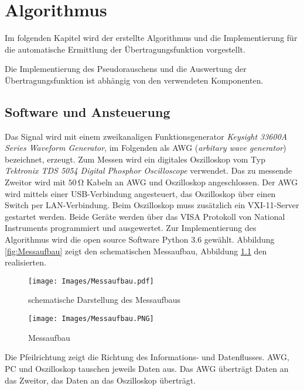 \documentclass[12pt,report,final,twoside,accentcolor=tud9b,bigchapter]{tudreport}
\begin{document}
\chapter{Algorithmus} \label{sec:algorithmus}
Im folgenden Kapitel wird der erstellte Algorithmus und die Implementierung für die automatische Ermittlung der Übertragungsfunktion vorgestellt.

Die Implementierung des Pseudorauschens und die Auswertung der Übertragungsfunktion ist abhängig von den verwendeten Komponenten.

\section{Software und Ansteuerung}
Das Signal wird mit einem zweikanaligen Funktionsgenerator \textit{Keysight 33600A Series Waveform Generator}, im Folgenden als AWG (\textit{arbitary wave generator}) bezeichnet, erzeugt. Zum Messen wird ein digitales Oszilloskop vom Typ \textit{Tektronix TDS 5054 Digital Phosphor Oscilloscope} verwendet. Das zu messende Zweitor wird mit $50\, \mathrm{\Omega}$ Kabeln an AWG und Oszilloskop angeschlossen.
Der AWG wird mittels einer USB-Verbindung angesteuert, das Oszilloskop über einen Switch per LAN-Verbindung. Beim Oszilloskop muss zusätzlich ein VXI-11-Server gestartet werden. 
Beide Geräte werden über das VISA Protokoll von National Instruments \cite{visa} programmiert und ausgewertet. Zur Implementierung des Algorithmus wird die open source Software Python 3.6 gewählt.\cite{Python} Abbildung \ref{fig:Messaufbau} zeigt den schematischen Messaufbau, Abbildung \ref{fig:Messaufbauecht} den realisierten. 
\begin{figure}[h!]
 \begin{minipage}[t]{0.48\linewidth}
  \centering
     \texttt{[image: Images/Messaufbau.pdf]}
     \caption{schematische Darstellung des Messaufbaus}
     \label{fig:Messaufbau}
  \end{minipage}
  \hfill
  \begin{minipage}[t]{0.48\linewidth}      
      \centering
          \texttt{[image: Images/Messaufbau.PNG]}
     \caption{Messaufbau}
     \label{fig:Messaufbauecht}
       \end{minipage}
\end{figure}
Die Pfeilrichtung zeigt die Richtung des Informations- und Datenflusses. AWG, PC und Oszilloskop tauschen jeweils Daten aus. Das AWG überträgt Daten an das Zweitor, das Daten an das Oszilloskop überträgt.
\end{document}
